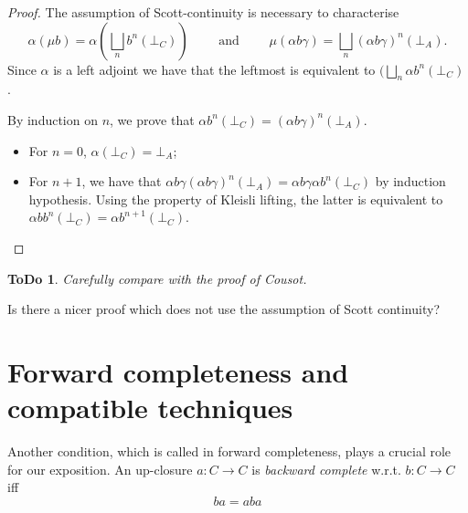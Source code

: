 \documentclass[smallcondensed,envcountsect,envcountsame]{svjour3}     %
\newtheorem{todo}[theorem]{\bf ToDo}
\begin{document}
\begin{proof} 
The assumption of Scott-continuity is necessary to characterise 
%
$$\alpha(\mu b) = \alpha (\bigsqcup_{n} b^n(\bot_C) ) \qquad \text{ and } \qquad \mu(\alpha b \gamma) =  \bigsqcup_{n} (\alpha b \gamma)^n(\bot_A) \text{.}$$ 
Since $\alpha$ is a left adjoint we have that the leftmost is equivalent to  $ (\bigsqcup_{n}  \alpha b^n(\bot_C) $.

By induction on $n$, we prove that $\alpha b^n(\bot_C) = (\alpha b \gamma)^n (\bot_A)$.
\begin{itemize}
\item For $n=0$, $\alpha(\bot_C) = \bot_A$;
\item For $n+1$, we have that $\alpha b \gamma (\alpha b \gamma)^n (\bot_A) = \alpha b\gamma \alpha b^n (\bot_C)$ by induction hypothesis. Using the property of Kleisli lifting, the latter is equivalent to $\alpha b b^n (\bot_C) = \alpha b^{n+1}(\bot_C)$.
\end{itemize}
\end{proof}
\begin{todo}
Carefully compare with the proof of Cousot.
\end{todo}

\begin{question}
Is there a nicer proof which does not use the assumption of Scott continuity?
\end{question}



\section{Forward completeness and compatible techniques}\label{sec:comp}

Another condition, which is called in \cite{} forward completeness, plays a crucial role for our exposition. An up-closure $a\colon C\to C$ is \emph{backward complete} w.r.t. $b\colon C\to C$ iff
\begin{equation}
ba = aba
\end{equation}
\end{document}
